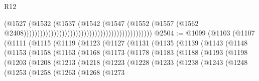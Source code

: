 \begin{lexlean}{R12}
\begin{coremodule}
{{{{{{{{{{{{{{{{{{{{{{{{{{{{{{{{{{{{{{{{{{{{{{{{{{{{{{{{{{{{{{{{{{{{{{{{{{{{{{{{{{{{{{{{{{{{{{{{{{{{{{{{{{                                                                                  (@1527
                                                                                    (@1532
                                                                                      (@1537
                                                                                        (@1542
                                                                                          (@1547
                                                                                            (@1552
                                                                                              (@1557
                                                                                                (@1562
                                                                                                  @2408)))))))))))))))))))))))))))))))))))))))))))))))
@2504 := @1099
    (@1103
      (@1107
        (@1111
          (@1115
            (@1119
              (@1123
                (@1127
                  (@1131
                    (@1135
                      (@1139
                        (@1143
                          (@1148
                            (@1153
                              (@1158
                                (@1163
                                  (@1168
                                    (@1173
                                      (@1178
                                        (@1183
                                          (@1188
                                            (@1193
                                              (@1198
                                                (@1203
                                                  (@1208
                                                    (@1213
                                                      (@1218
                                                        (@1223
                                                          (@1228
                                                            (@1233
                                                              (@1238
                                                                (@1243
                                                                  (@1248
                                                                    (@1253
                                                                      (@1258
                                                                        (@1263
                                                                          (@1268
                                                                            (@1273
}}}}}}}}}}}}}}}}}}}}}}}}}}}}}}}}}}}}}}}}}}}}}}}}}}}}}}}}}}}}}}}}}}}}}}}}}}}}}}}}}}}}}}}}}}}}}}}}}}}}}}}}}}
\end{coremodule}
\end{lexlean}
